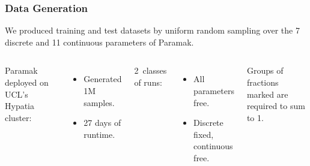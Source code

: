 \begin{frame}
	\frametitle{Data Generation}
	We produced training and test datasets by uniform random sampling over the 7
	discrete and 11 continuous parameters of Paramak.

	\begin{columns}[T]

		\vspace{5pt}

		Paramak deployed on UCL's Hypatia cluster:
		\begin{itemize}
		\item Generated 1M samples.
		\item 27 days of runtime.
		\end{itemize}

		\vspace{10pt}

		2~classes of runs:
		\begin{itemize}
		\item All parameters free.
		\item Discrete fixed, continuous free.
		\end{itemize}

		\vspace{10pt}

		{\footnotesize
		Groups of fractions marked\textsuperscript{\textdagger\textdaggerdbl} are required to sum to 1.
		}

		\vspace{5pt}


\end{columns}
\end{frame}
